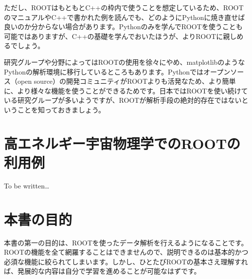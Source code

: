 ただし、ROOTはもともとC++の枠内で使うことを想定しているため、ROOTのマニュアルやC++で書かれた例を読んでも、どのようにPythonに焼き直せば良いのか分からない場合があります。Pythonのみを学んでROOTを使うことも可能ではありますが、C++の基礎を学んでおいたほうが、よりROOTに親しめるでしょう。

研究グループや分野によってはROOTの使用を徐々にやめ、matplotlibのようなPythonの解析環境に移行しているところもあります。Pythonではオープンソース（open source）の開発コミュニティがROOTよりも活発なため、より簡単に、より様々な機能を使うことができるためです。日本ではROOTを使い続けている研究グループが多いようですが、ROOTが解析手段の絶対的存在ではないということを知っておきましょう。

\section{高エネルギー宇宙物理学でのROOTの利用例}
To be written\ldots


\section{本書の目的}

本書の第一の目的は、ROOTを使ったデータ解析を行えるようになることです。ROOTの機能を全て網羅することはできませんので、説明できるのは基本的かつ必須な機能に絞られてしまいます。しかし、ひとたびROOTの基本さえ理解すれば、発展的な内容は自分で学習を進めることが可能なはずです。

